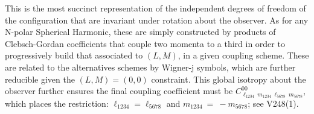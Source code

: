 \documentclass[useAMS,usenatbib]{mn2e}
\newcommand{\nj}[9]{ \begin{Bmatrix}
   #1 & #2 & #3 \\
   #4 & #5 & #6 \\ 
   #7 & #8 & #9
  \end{Bmatrix}}
\begin{document}
This is the most succinct representation of the independent degrees of freedom of the configuration that are invariant under rotation about the observer.  As for any N-polar Spherical Harmonic, these are simply constructed by products of Clebsch-Gordan coefficients that couple two momenta to a third in order to progressively build that associated to $(L, M)$, in a given coupling scheme.  These are related to the alternatives schemes by Wigner-j symbols, which are further reducible given the $(L,M) = (0,0)$ constraint.  This global isotropy about the observer further ensures the final coupling coefficient must be $C^{00}_{\ell_{1234} \ m_{1234} \ \ell_{5678} \ m_{5678}}$, which places the restriction: $\ell_{1234} = \ell_{5678}$ and $m_{1234}~=~-m_{5678}$; see V248(1).
\end{document}
